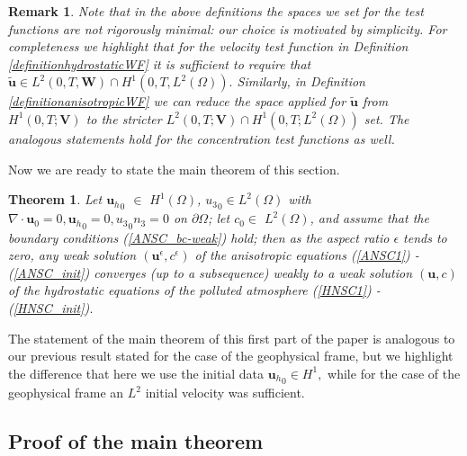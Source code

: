 \documentclass[11pt]{article}
\newtheorem{theorem}{Theorem}
\newtheorem{remark}{Remark}
\begin{document}
\begin{remark}
Note that in the above definitions the spaces we set for the test functions are not rigorously minimal: our choice is motivated by simplicity. For completeness we highlight that for the velocity test function in Definition \ref{definitionhydrostaticWF} it is sufficient to require that $\mathbf{\tilde{u}} \in L^2 (0,T, \mathbf{W}) \cap H^1(0,T, L^2(\Omega)).$ Similarly, in Definition \ref{definitionanisotropicWF} we can reduce the space applied for $\mathbf{\tilde{u}}$ from $H^1 (0,T;\mathbf{V})$ to the stricter $L^2 (0,T;\mathbf{V}) \cap H^1 (0,T; L^2(\Omega))$ set. The analogous statements hold for the concentration test functions as well.
\end{remark}

Now we are ready to state the main theorem of this section.

\begin{theorem} \label{maintheoremWEAK}
Let ${\mathbf{u}_h}_0$ $\in$ $H^1 (\Omega)$, ${u_3}_0 \in L^2(\Omega)$ with $\nabla \cdot \mathbf{u}_0 = 0, {\mathbf{u}_h}_0 = 0, {u_3}_0 n_3 = 0$ on $\partial \Omega$; let $c_0 \in$ $L^2 (\Omega)$, and assume that the boundary conditions (\ref{ANSC_bc-weak}) hold; then as the aspect ratio $\epsilon$ tends to zero, any weak solution $(\mathbf{u}^\epsilon, c^\epsilon)$ of the anisotropic equations (\ref{ANSC1}) - (\ref{ANSC_init}) converges (up to a subsequence) weakly to a weak solution $(\mathbf{u}, c)$ of the hydrostatic equations of the polluted atmosphere (\ref{HNSC1}) - (\ref{HNSC_init}).
\end{theorem}

The statement of the main theorem of this first part of the paper is analogous to our previous result stated for the case of the geophysical frame, but we highlight the difference that here we use the initial data ${\mathbf{u}_h}_0 \in H^1,$ while for the case of the geophysical frame an $L^2$ initial velocity was sufficient.

\subsection{Proof of the main theorem} \label{proof}
\end{document}
